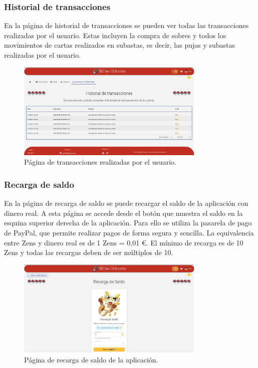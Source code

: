 \begin{enumerate}
\subsubsection{Historial de transacciones}
En la página de historial de transacciones se pueden ver todas las transacciones realizadas por el usuario.
Estas incluyen la compra de sobres y todos los movimientos de cartas realizados en subastas, es decir,
las pujas y subastas realizadas por el usuario.

\begin{figure}[H]
    \centering
    \includegraphics[width=0.8\textwidth]{figures/6-Analisis/6-Interfaz/interfaz/transacciones.png}
    \caption{Página de transacciones realizadas por el usuario.}
    \label{fig:interfaz-transacciones}
\end{figure}


\subsubsection{Recarga de saldo}
En la página de recarga de saldo se puede recargar el saldo de la aplicación con dinero real.
A esta página se accede desde el botón que muestra el saldo en la esquina superior derecha de la aplicación.
Para ello se utiliza la pasarela de pago de PayPal, que permite realizar pagos de forma segura y sencilla.
La equivalencia entre Zens y dinero real es de 1 Zens = 0,01 €.
El mínimo de recarga es de 10 Zens y todas las recargas deben de ser múltiplos de 10.

\begin{figure}[H]
    \centering
    \includegraphics[width=0.8\textwidth]{figures/6-Analisis/6-Interfaz/interfaz/recarga.png}
    \caption{Página de recarga de saldo de la aplicación.}
    \label{fig:m-interfaz-recarga}
\end{figure}


\end{enumerate}
